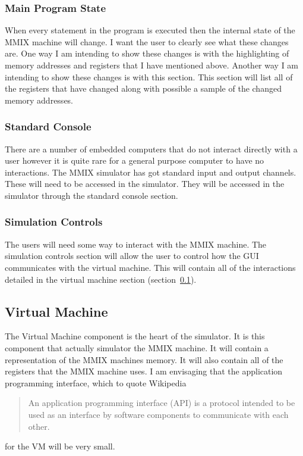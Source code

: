 \documentclass[11pt]{article} %
\begin{document}
\subsubsection{Main Program State}
When every statement in the program is executed then the internal state of the MMIX machine will change.  I want the user to clearly see what these changes are.  One way I am intending to show these changes is with the highlighting of memory addresses and registers that I have mentioned above.  Another way I am intending to show these changes is with this section.  This section will list all of the registers that have changed along with possible a sample of the changed memory addresses. 
\subsubsection{Standard Console}
There are a number of embedded computers that do not interact directly with a user however it is quite rare for a general purpose computer to have no interactions.  The MMIX simulator has got standard input and output channels.  These will need to be accessed in the simulator.  They will be accessed in the simulator through the standard console section.
\subsubsection{Simulation Controls}
The users will need some way to interact with the MMIX machine.  The simulation controls section will allow the user to control how the GUI communicates with the virtual machine. This will contain all of the interactions detailed in the virtual machine section (section~\ref{sec:VM}). 
\subsection{Virtual Machine}
\label{sec:VM}
The Virtual Machine component is the heart of the simulator.  It is this component that actually simulator the MMIX machine.  It will contain a representation of the MMIX machines memory. It will also contain all of the registers that the MMIX machine uses. I am envisaging that the application programming interface, which to quote Wikipedia~\cite{ref:api}
\begin{quote}
	An application programming interface (API) is a protocol intended to be used as an interface by software components to communicate with each other.
\end{quote}
for the VM will be very small.
\end{document}

